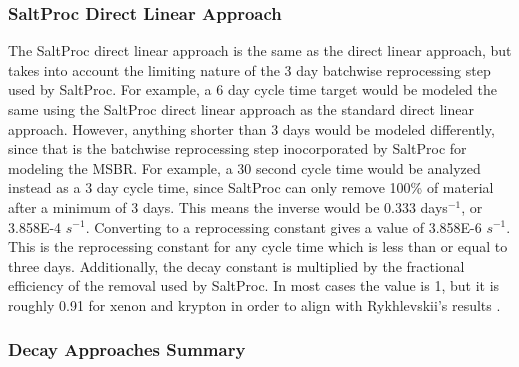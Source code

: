 

\subsubsection{SaltProc Direct Linear Approach}

The SaltProc direct linear approach is the same as the direct linear approach, but takes into account the limiting nature of the 3 day batchwise reprocessing step used by SaltProc. For example, a 6 day cycle time target would be modeled the same using the SaltProc direct linear approach as the standard direct linear approach. However, anything shorter than 3 days would be modeled differently, since that is the batchwise reprocessing step inocorporated by SaltProc for modeling the MSBR. For example, a 30 second cycle time would be analyzed instead as a 3 day cycle time, since SaltProc can only remove 100\% of material after a minimum of 3 days. This means the inverse would be 0.333 days$^{-1}$, or 3.858E-4 $s^{-1}$. Converting to a reprocessing constant gives a value of 3.858E-6 $s^{-1}$. This is the reprocessing constant for any cycle time which is less than or equal to three days. Additionally, the decay constant is multiplied by the fractional efficiency of the removal used by SaltProc. In most cases the value is 1, but it is roughly 0.91 for xenon and krypton in order to align with Rykhlevskii's results \cite{rykhlevskii_fuel_2020}.

\subsubsection{Decay Approaches Summary}



